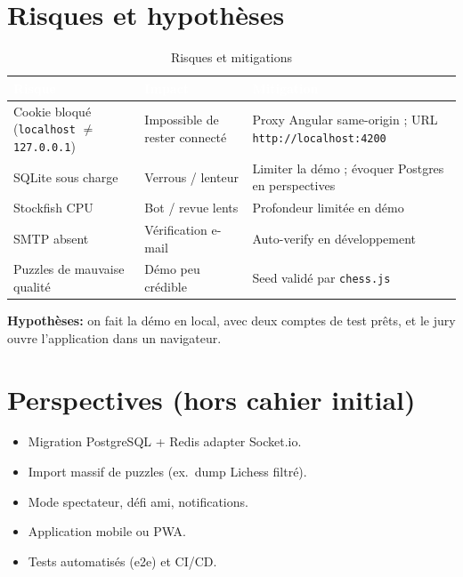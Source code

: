 \documentclass[12pt,a4paper,oneside]{article}
\begin{document}
\section{Risques et hypothèses}

\begin{table}[H]
\centering
\caption{Risques et mitigations}
\small
\begin{tabularx}{\linewidth}{|X|X|X|}
\hline
\rowcolor{sectionblue}
\textcolor{white}{\textbf{Risque}} & \textcolor{white}{\textbf{Impact}} & \textcolor{white}{\textbf{Mitigation}} \\
\hline
Cookie bloqué (\texttt{localhost} $\neq$ \texttt{127.0.0.1}) & Impossible de rester connecté & Proxy Angular same-origin ; URL \texttt{http://localhost:4200} \\
\hline
SQLite sous charge & Verrous / lenteur & Limiter la démo ; évoquer Postgres en perspectives \\
\hline
Stockfish CPU & Bot / revue lents & Profondeur limitée en démo \\
\hline
SMTP absent & Vérification e-mail & Auto-verify en développement \\
\hline
Puzzles de mauvaise qualité & Démo peu crédible & Seed validé par \texttt{chess.js} \\
\hline
\end{tabularx}
\end{table}

\noindent\textbf{Hypothèses:} on fait la démo en local, avec deux comptes de test prêts, et le jury ouvre l'application dans un navigateur.

\section{Perspectives (hors cahier initial)}

\begin{itemize}
  \item Migration PostgreSQL + Redis adapter Socket.io.
  \item Import massif de puzzles (ex.\ dump Lichess filtré).
  \item Mode spectateur, défi ami, notifications.
  \item Application mobile ou PWA.
  \item Tests automatisés (e2e) et CI/CD.
\end{itemize}
\end{document}
